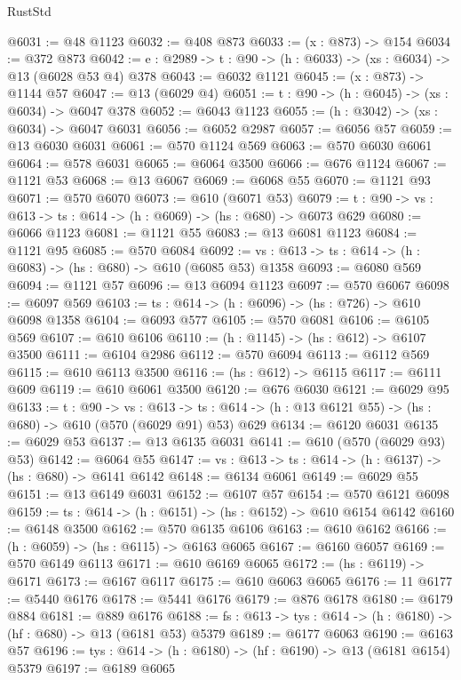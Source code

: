 \begin{lexlean}{RustStd}
\begin{coremodule}
@6031 := @48 @1123
@6032 := @408 @873
@6033 := (x : @873) -> @154
@6034 := @372 @873
@6042 := {e : @2989} -> {t : @90} -> (h : @6033) -> (xs : @6034) -> @13 (@6028 @53 @4) @378
@6043 := @6032 @1121
@6045 := (x : @873) -> @1144 @57
@6047 := @13 (@6029 @4)
@6051 := {t : @90} -> (h : @6045) -> (xs : @6034) -> @6047 @378
@6052 := @6043 @1123
@6055 := (h : @3042) -> (xs : @6034) -> @6047 @6031
@6056 := @6052 @2987
@6057 := @6056 @57
@6059 := @13 @6030 @6031
@6061 := @570 @1124 @569
@6063 := @570 @6030 @6061
@6064 := @578 @6031
@6065 := @6064 @3500
@6066 := @676 @1124
@6067 := @1121 @53
@6068 := @13 @6067
@6069 := @6068 @55
@6070 := @1121 @93
@6071 := @570 @6070
@6073 := @610 (@6071 @53)
@6079 := {t : @90} -> {vs : @613} -> {ts : @614} -> (h : @6069) -> (hs : @680) -> @6073 @629
@6080 := @6066 @1123
@6081 := @1121 @55
@6083 := @13 @6081 @1123
@6084 := @1121 @95
@6085 := @570 @6084
@6092 := {vs : @613} -> {ts : @614} -> (h : @6083) -> (hs : @680) -> @610 (@6085 @53) @1358
@6093 := @6080 @569
@6094 := @1121 @57
@6096 := @13 @6094 @1123
@6097 := @570 @6067
@6098 := @6097 @569
@6103 := {ts : @614} -> (h : @6096) -> (hs : @726) -> @610 @6098 @1358
@6104 := @6093 @577
@6105 := @570 @6081
@6106 := @6105 @569
@6107 := @610 @6106
@6110 := (h : @1145) -> (hs : @612) -> @6107 @3500
@6111 := @6104 @2986
@6112 := @570 @6094
@6113 := @6112 @569
@6115 := @610 @6113 @3500
@6116 := (hs : @612) -> @6115
@6117 := @6111 @609
@6119 := @610 @6061 @3500
@6120 := @676 @6030
@6121 := @6029 @95
@6133 := {t : @90} ->
  {vs : @613} ->
  {ts : @614} -> (h : @13 @6121 @55) -> (hs : @680) -> @610 (@570 (@6029 @91) @53) @629
@6134 := @6120 @6031
@6135 := @6029 @53
@6137 := @13 @6135 @6031
@6141 := @610 (@570 (@6029 @93) @53)
@6142 := @6064 @55
@6147 := {vs : @613} -> {ts : @614} -> (h : @6137) -> (hs : @680) -> @6141 @6142
@6148 := @6134 @6061
@6149 := @6029 @55
@6151 := @13 @6149 @6031
@6152 := @6107 @57
@6154 := @570 @6121 @6098
@6159 := {ts : @614} -> (h : @6151) -> (hs : @6152) -> @610 @6154 @6142
@6160 := @6148 @3500
@6162 := @570 @6135 @6106
@6163 := @610 @6162
@6166 := (h : @6059) -> (hs : @6115) -> @6163 @6065
@6167 := @6160 @6057
@6169 := @570 @6149 @6113
@6171 := @610 @6169 @6065
@6172 := (hs : @6119) -> @6171
@6173 := @6167 @6117
@6175 := @610 @6063 @6065
@6176 := 11
@6177 := @5440 @6176
@6178 := @5441 @6176
@6179 := @876 @6178
@6180 := @6179 @884
@6181 := @889 @6176
@6188 := {fs : @613} -> {tys : @614} -> (h : @6180) -> (hf : @680) -> @13 (@6181 @53) @5379
@6189 := @6177 @6063
@6190 := @6163 @57
@6196 := {tys : @614} -> (h : @6180) -> (hf : @6190) -> @13 (@6181 @6154) @5379
@6197 := @6189 @6065

\end{coremodule}
\end{lexlean}
